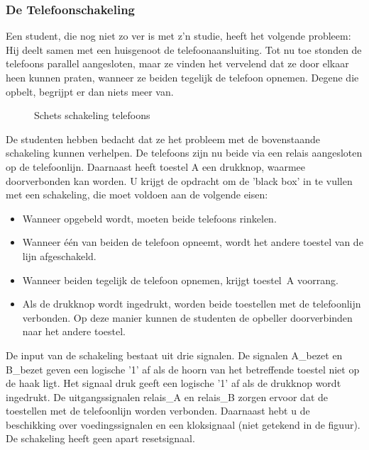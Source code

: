 \clearpage
\subsubsection{De Telefoonschakeling}
Een student, die nog niet zo ver is met z'n studie, heeft het volgende probleem:
Hij deelt samen met een huisgenoot de telefoonaansluiting.
Tot nu toe stonden de telefoons parallel aangesloten, maar ze
vinden het vervelend dat ze
door elkaar heen kunnen praten, wanneer ze beiden tegelijk de telefoon opnemen.
Degene die opbelt, begrijpt er dan niets meer van.

\begin{figure}[h]
\centerline{}
\caption{Schets schakeling telefoons}
\end{figure}

De studenten hebben bedacht dat ze het probleem met de bovenstaande schakeling
kunnen verhelpen. De telefoons zijn nu beide via een relais
aangesloten op de telefoonlijn.
Daarnaast heeft toestel A een drukknop, waarmee doorverbonden kan worden. 
U krijgt de opdracht om de 'black box' in te vullen met
een schakeling, die moet voldoen aan de volgende eisen:

\begin{itemize}
\item
Wanneer opgebeld wordt, moeten beide telefoons rinkelen.
\item
Wanneer \'e\'en van beiden de telefoon opneemt, wordt het andere
toestel van de lijn afgeschakeld.
\item
Wanneer beiden tegelijk de telefoon opnemen, krijgt toestel~A voorrang.
\item
Als de drukknop wordt ingedrukt, worden beide toestellen met de
telefoonlijn verbonden. Op deze manier kunnen de studenten de opbeller
doorverbinden naar het andere toestel.
\end{itemize}

De input van de schakeling bestaat uit drie signalen.
De signalen A\_bezet en B\_bezet geven een logische '1' af als de hoorn
van het betreffende toestel niet op de haak ligt.
Het signaal druk geeft een logische '1' af als de drukknop 
wordt ingedrukt.
De uitgangssignalen relais\_A en relais\_B zorgen ervoor dat de
toestellen met de telefoonlijn worden verbonden.
Daarnaast hebt u de beschikking over voedingssignalen en een kloksignaal
(niet getekend in de figuur). De schakeling heeft geen apart resetsignaal.        
\clearpage
\cleardoublepage




